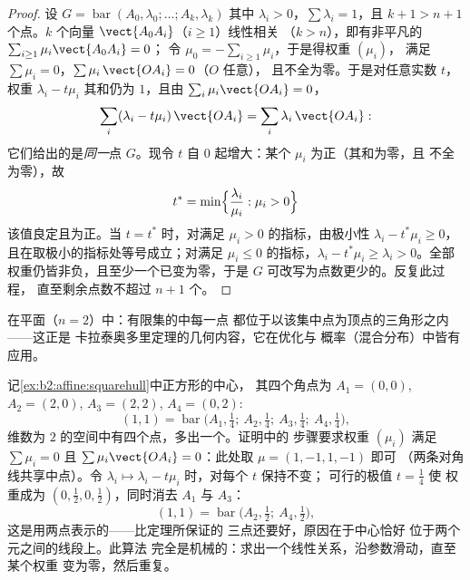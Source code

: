 \begin{proof}
设 $G = \operatorname{bar}(A_0, \lambda_0; \dots; A_k, \lambda_k)$
其中 $\lambda_i > 0$，$\sum\lambda_i = 1$，且 $k + 1 > n + 1$
个点。$k$ 个向量 $\vect{A_0A_i}$（$i \geq 1$）线性相关
（$k > n$），即有非平凡的 $\sum_{i\geq1}\mu_i \vect{A_0A_i} = 0$；
令 $\mu_0 = -\sum_{i\geq1}\mu_i$，于是得权重 $(\mu_i)$，
满足 $\sum\mu_i = 0$，$\sum \mu_i\,\vect{OA_i} = 0$（$O$ 任意），
且不全为零。于是对任意实数 $t$，权重 $\lambda_i - t\mu_i$
其和仍为 $1$，且由 $\sum_i\mu_i\vect{OA_i} = 0$，
\[
\sum_i(\lambda_i - t\mu_i)\,\vect{OA_i}
= \sum_i\lambda_i\,\vect{OA_i} :
\]
它们给出的是\emph{同一}点 $G$。现令 $t$ 自
$0$ 起增大：某个 $\mu_i$ 为正（其和为零，且
不全为零），故
\[
t^* = \min\Bigl\{\frac{\lambda_i}{\mu_i} : \mu_i > 0\Bigr\}
\]
该值良定且为正。当 $t = t^*$ 时，对满足
$\mu_i > 0$ 的指标，由极小性 $\lambda_i - t^*\mu_i \geq 0$，
且在取极小的指标处等号成立；对满足 $\mu_i
\leq 0$ 的指标，$\lambda_i - t^*\mu_i \geq \lambda_i > 0$。全部
权重仍皆非负，且至少一个已变为零，于是 $G$
可改写为点数更少的。反复此过程，
直至剩余点数不超过 $n + 1$ 个。
\end{proof}

\begin{example}
在平面（$n = 2$）中：有限集的中每一点
都位于以该集中点为顶点的三角形之内——这正是
卡拉泰奥多里定理的几何内容，它在优化与
概率（混合分布）中皆有应用。
\end{example}

\begin{example}\label{ex:b2:affine:caratheodoryrun}
记\cref{ex:b2:affine:squarehull}中正方形的中心，
其四个角点为 $A_1 =
(0,0)$, $A_2 = (2,0)$, $A_3 = (2,2)$, $A_4 = (0,2)$:
\[
(1,1) = \operatorname{bar}\bigl(A_1, \tfrac14;\ A_2,
\tfrac14;\ A_3, \tfrac14;\ A_4, \tfrac14\bigr),
\]
维数为 $2$ 的空间中有四个点，多出一个。证明中的
步骤要求权重 $(\mu_i)$ 满足 $\sum\mu_i = 0$ 且
$\sum\mu_i\vect{OA_i} = 0$：此处取 $\mu = (1, -1, 1, -1)$ 即可
（两条对角线共享中点）。令 $\lambda_i
\mapsto \lambda_i - t\mu_i$ 时，对每个 $t$ 保持不变；
可行的极值 $t = \frac14$ 使
权重成为 $(0, \tfrac12, 0, \tfrac12)$，同时消去 $A_1$ 与
$A_3$：
\[
(1,1) = \operatorname{bar}\bigl(A_2, \tfrac12;\ A_4,
\tfrac12\bigr),
\]
这是用两点表示的——比定理所保证的
三点还要好，原因在于中心恰好
位于两个元之间的线段上。此算法
完全是机械的：求出一个线性关系，沿参数滑动，直至某个权重
变为零，然后重复。
\end{example}

